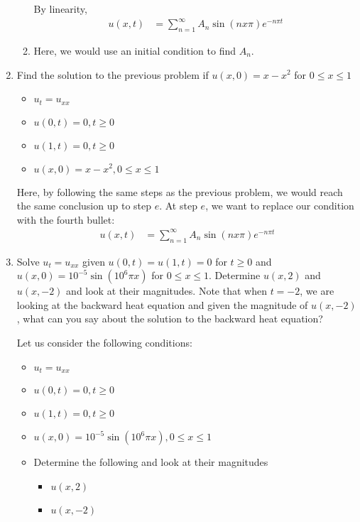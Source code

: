 \documentclass{article}
\begin{document}
\begin{enumerate}
\begin{enumerate}
  By linearity,
  \begin{align}
    u(x, t) & =
    \sum^\infty_{n = 1}
    A_n
    \sin(n x \pi)
    e^{-n \pi t}
  \end{align}
  \item Here, we would use an initial condition to find $A_n$.
\end{enumerate}
%
%
\item Find the solution to the previous problem if $u(x, 0) = x - x^2$ for $0 \leq x \leq 1$

\begin{itemize}
  \item $u_t = u_{xx}$
  \item $u(0, t) = 0, t \geq 0$
  \item $u(1, t) = 0, t \geq 0$
  \item $u(x, 0) = x - x^2, 0 \leq x \leq 1$
\end{itemize}

Here, by following the same steps as the previous problem, we would reach the same conclusion up to step $e$. At step $e$, we want to replace our condition with the fourth bullet:
%
\begin{align}
  u(x, t) & = \sum^\infty_{n = 1} A_n \sin(n x \pi)e^{-n \pi t}
\end{align}
%
%
\newpage
%
%
  \item Solve $u_t = u_{xx}$ given $u(0, t) = u(1, t) = 0$ for $t \geq 0$ and $u(x, 0) = 10^{-5} \sin(10^6 \pi x)$ for $0 \leq x \leq 1$. Determine $u(x, 2)$ and $u(x, -2)$ and look at their magnitudes. Note that when $t = -2$, we are looking at the backward heat equation and given the magnitude of $u(x, -2)$, what can you say about the solution to the backward heat equation?

  Let us consider the following conditions:
  \begin{itemize}
    \item $u_t = u_{xx}$
    \item $u(0, t) = 0, t \geq 0$
    \item $u(1, t) = 0, t \geq 0$
    \item $u(x, 0) = 10^{-5} \sin(10^6 \pi x), 0 \leq x \leq 1$
    \item Determine the following and look at their magnitudes
    \begin{itemize}
      \item $u(x, 2)$
      \item $u(x, -2)$
    \end{itemize}
  \end{itemize}


\end{enumerate}
\end{document}
